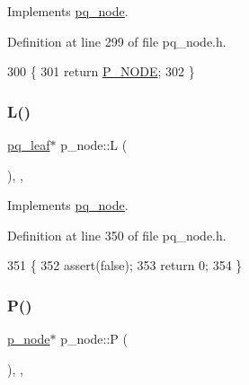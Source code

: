 Implements \mbox{\hyperlink{classpq__node_aa9873c0cfad88bc4404857ce57d422e4}{pq\+\_\+node}}.



Definition at line 299 of file pq\+\_\+node.\+h.


\begin{DoxyCode}
300     \{
301     \textcolor{keywordflow}{return} \mbox{\hyperlink{classpq__node_a96827bdca8bf81d20213405dd27f8fa6a0ea3d0eae8dd06c7039082054828ce77}{P\_NODE}};
302     \}
\end{DoxyCode}
\mbox{\label{classp__node_a350eef32dca1dd9cf8cbb2771b4f3c9b}} 
\subsubsection{\texorpdfstring{L()}{L()}}
{\footnotesize\ttfamily \mbox{\hyperlink{classpq__leaf}{pq\+\_\+leaf}}$\ast$ p\+\_\+node\+::L (\begin{DoxyParamCaption}{ }\end{DoxyParamCaption})\hspace{0.3cm}{\ttfamily [inline]}, {\ttfamily [private]}, {\ttfamily [virtual]}}



Implements \mbox{\hyperlink{classpq__node_a805b6ef48c847380b47c8ba882ed4ee2}{pq\+\_\+node}}.



Definition at line 350 of file pq\+\_\+node.\+h.


\begin{DoxyCode}
351     \{
352     assert(\textcolor{keyword}{false});
353     \textcolor{keywordflow}{return} 0;
354     \}
\end{DoxyCode}
\mbox{\label{classp__node_a4d8d7a171935a008f0718275dede2b43}} 
\subsubsection{\texorpdfstring{P()}{P()}}
{\footnotesize\ttfamily \mbox{\hyperlink{classp__node}{p\+\_\+node}}$\ast$ p\+\_\+node\+::P (\begin{DoxyParamCaption}{ }\end{DoxyParamCaption})\hspace{0.3cm}{\ttfamily [inline]}, {\ttfamily [private]}, {\ttfamily [virtual]}}



